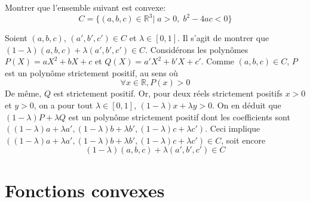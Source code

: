 \documentclass{fancybook}
\begin{document}
\begin{exercice}
Montrer que l'ensemble suivant est convexe: $$C=\{(a,b,c)\in \mathbb R^3|\; a>0,\; b^2-4ac<0\}$$
\end{exercice}
Soient $(a,b,c)$, $(a',b',c')\in C$ et $\lambda \in [0,1]$.\newline
 Il s'agit de montrer que $(1-\lambda)(a,b,c) + \lambda(a',b',c')\in C$.\newline
 Considérons les polynômes $P(X)=aX^2 + bX + c$ et $Q(X)=a'X^2 + b'X + c'$. Comme $(a,b,c)\in C$, $P$ est un polynôme strictement positif, au sens où $$\forall x \in \mathbb R, P(x)>0$$
 De même, $Q$ est strictement positif.\newline \newline
 Or, pour deux réels strictement positifs $x>0$ et $y>0$, on a pour tout $\lambda \in [0,1]$, $(1-\lambda)x +\lambda y>0$. \newline \newline
 On en déduit que $(1-\lambda)P +\lambda Q$ est un polynôme strictement positif dont les coefficients  sont $((1-\lambda)a+\lambda a',(1-\lambda)b+\lambda b',(1-\lambda)c+\lambda c')$.\newline
 Ceci implique $((1-\lambda)a+\lambda a',(1-\lambda)b+\lambda b',(1-\lambda)c+\lambda c')\in C$, soit encore $$(1-\lambda)(a,b,c) + \lambda(a',b',c')\in C$$



\newpage
\section{Fonctions convexes}
\end{document}
